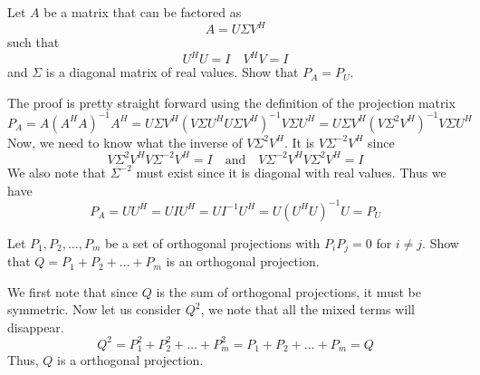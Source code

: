 \documentclass{homework}
\begin{document}
\begin{problem}
  Let $A$ be a matrix that can be factored as
  \[ A = U\Sigma V^H\]
  such that
  \[ U^H U = I \quad V^HV = I\]
  and $\Sigma$ is a diagonal matrix of real values. Show that $P_A = P_U$.
\end{problem}

\begin{solution}
  The proof is pretty straight forward using the definition of the projection matrix
  \[ P_A = A(A^HA)^{-1}A^H = U\Sigma V^H(V\Sigma U^HU\Sigma V^H)^{-1}V\Sigma U^H = U\Sigma V^H(V\Sigma^2 V^H)^{-1}V\Sigma U^H \]
  Now, we need to know what the inverse of $V\Sigma^2 V^{H}$. It is $V\Sigma^{-2}V^{H}$ since
  \[ V\Sigma^2 V^{H} V\Sigma^{-2}V^{H} = I \quad \text{and} \quad V\Sigma^{-2}V^H V \Sigma^2 V^{H} = I\]
  We also note that $\Sigma^{-2}$ must exist since it is diagonal with real values. Thus we have
  \[P_A = UU^H = UIU^H = UI^{-1}U^H = U(U^HU)^{-1}U = P_U\]
\end{solution}

\begin{problem}
  Let $P_1, P_2, \dots, P_m$ be a set of orthogonal projections with $P_iP_j = 0$ for $i \neq j$. Show that $Q = P_1 + P_2 + \dots + P_m$ is an orthogonal projection. 
\end{problem}

\begin{solution}
  We first note that since $Q$ is the sum of orthogonal projections, it must be symmetric. Now let us consider $Q^2$, we note that all the mixed terms will disappear.
  \[ Q^2 = P_1^2 + P_2^2 + \dots + P_m^2 =  P_1 + P_2 + \dots + P_m = Q\]
  Thus, $Q$ is a orthogonal projection.
\end{solution}

\begin{problem}
  
\end{problem}

\begin{problem}
\end{problem}
\end{document}
